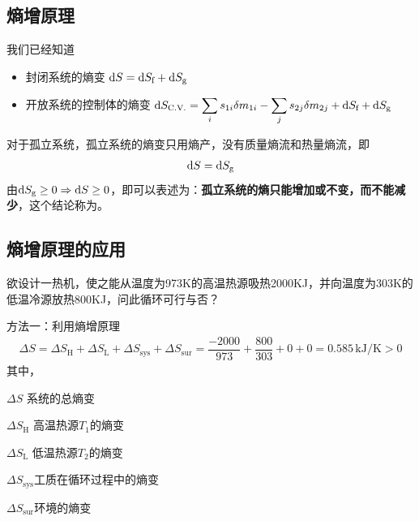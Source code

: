 \subsection{熵增原理}
\noindent 我们已经知道

\begin{itemize}
	\item 封闭系统的熵变 \quad ${\rm{d}} S = {\rm{d}} S_{\text{f}} + {\rm{d}} S_\text{g}$
	\item 开放系统的控制体的熵变 \quad $\displaystyle {\rm{d}} S_{\text{C.V.}} = \sum_i s_{1i}\delta m_{1i} - \sum_j s_{2j} \delta m_{2j} + {\rm{d}} S_{\text{f}} + {\rm{d}} S_{\text{g}}$
\end{itemize}

\ttheorem[熵增原理]
对于孤立系统，孤立系统的熵变只用熵产，没有质量熵流和热量熵流，即
\begin{align}
	{\rm{d}} S = {\rm{d}} S_{\text{g}}
\end{align}
由${\rm{d}} S_{\text{g}} \ge 0 \Rightarrow {\rm{d}} S \ge 0$，即可以表述为：\textbf{孤立系统的熵只能增加或不变，而不能减少}，这个结论称为。


\subsection{熵增原理的应用}
\vspace*{-1em}

\example[判断循环可行与否]
欲设计一热机，使之能从温度为973K的高温热源吸热2000KJ，并向温度为303K的低温冷源放热800KJ，问此循环可行与否？

\solve
方法一：利用熵增原理
\begin{align*}
	\Delta S = \Delta S_{\text{H}} + \Delta S_{\text{L}} + \Delta S_{\text{sys}} + \Delta S_{\text{sur}} = \dfrac{-2000}{973} + \dfrac{800}{303} + 0 + 0 = 0.585\,\text{kJ/K} > 0
\end{align*}
其中，
\begin{myitemize}
	\item $\Delta S$ \quad 系统的总熵变
	\item $\Delta S_{\text{H}}$ \quad 高温热源$T_1$的熵变
	\item $\Delta S_{\text{L}}$ \quad 低温热源$T_2$的熵变
	\item $\Delta S_{\text{sys}}$\quad 工质在循环过程中的熵变
	\item $\Delta S_{\text{sur}}$\quad 环境的熵变\vspace*{0.3em}
\end{myitemize}

